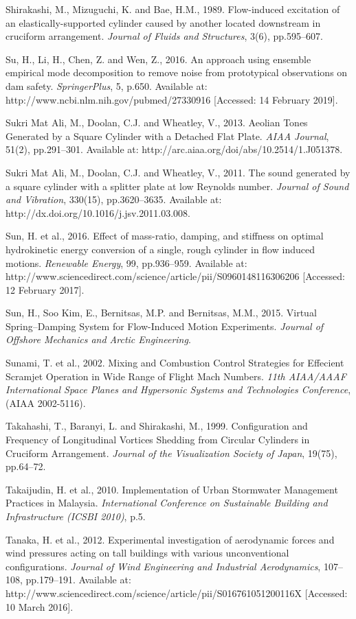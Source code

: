 \documentclass[]{article}
\begin{document}
Shirakashi, M., Mizuguchi, K. and Bae, H.M., 1989. Flow-induced
excitation of an elastically-supported cylinder caused by another
located downstream in cruciform arrangement. \emph{Journal of Fluids and
Structures}, 3(6), pp.595--607.

Su, H., Li, H., Chen, Z. and Wen, Z., 2016. An approach using ensemble
empirical mode decomposition to remove noise from prototypical
observations on dam safety. \emph{SpringerPlus}, 5, p.650. Available at:
http://www.ncbi.nlm.nih.gov/pubmed/27330916 {[}Accessed: 14 February
2019{]}.

Sukri Mat Ali, M., Doolan, C.J. and Wheatley, V., 2013. Aeolian Tones
Generated by a Square Cylinder with a Detached Flat Plate. \emph{AIAA
Journal}, 51(2), pp.291--301. Available at:
http://arc.aiaa.org/doi/abs/10.2514/1.J051378.

Sukri Mat Ali, M., Doolan, C.J. and Wheatley, V., 2011. The sound
generated by a square cylinder with a splitter plate at low Reynolds
number. \emph{Journal of Sound and Vibration}, 330(15), pp.3620--3635.
Available at: http://dx.doi.org/10.1016/j.jsv.2011.03.008.

Sun, H. et al., 2016. Effect of mass-ratio, damping, and stiffness on
optimal hydrokinetic energy conversion of a single, rough cylinder in
flow induced motions. \emph{Renewable Energy}, 99, pp.936--959.
Available at:
http://www.sciencedirect.com/science/article/pii/S0960148116306206
{[}Accessed: 12 February 2017{]}.

Sun, H., Soo Kim, E., Bernitsas, M.P. and Bernitsas, M.M., 2015. Virtual
Spring--Damping System for Flow-Induced Motion Experiments.
\emph{Journal of Offshore Mechanics and Arctic Engineering}.

Sunami, T. et al., 2002. Mixing and Combustion Control Strategies for
Effecient Scramjet Operation in Wide Range of Flight Mach Numbers.
\emph{11th AIAA/AAAF International Space Planes and Hypersonic Systems
and Technologies Conference}, (AIAA 2002-5116).

Takahashi, T., Baranyi, L. and Shirakashi, M., 1999. Configuration and
Frequency of Longitudinal Vortices Shedding from Circular Cylinders in
Cruciform Arrangement. \emph{Journal of the Visualization Society of
Japan}, 19(75), pp.64--72.

Takaijudin, H. et al., 2010. Implementation of Urban Stormwater
Management Practices in Malaysia. \emph{International Conference on
Sustainable Building and Infrastructure (ICSBI 2010)}, p.5.

Tanaka, H. et al., 2012. Experimental investigation of aerodynamic
forces and wind pressures acting on tall buildings with various
unconventional configurations. \emph{Journal of Wind Engineering and
Industrial Aerodynamics}, 107--108, pp.179--191. Available at:
http://www.sciencedirect.com/science/article/pii/S016761051200116X
{[}Accessed: 10 March 2016{]}.
\end{document}
